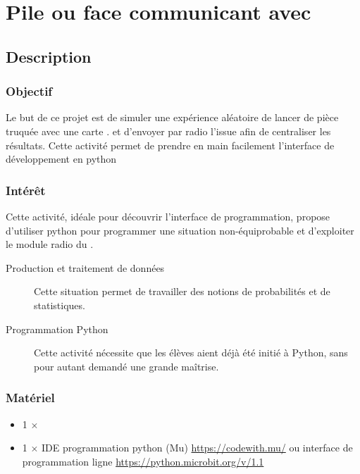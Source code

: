 
\section{Pile ou face communicant avec \mbpy}


\subsection{Description}

\subsubsection{Objectif}

\begin{formule}
Le but de ce projet est de simuler une expérience aléatoire de lancer de pièce truquée avec une carte \mb. et d'envoyer par radio l'issue afin de centraliser les résultats.
Cette activité permet de prendre en main facilement l'interface de développement en python
\end{formule}

\subsubsection{Intérêt}
Cette activité, idéale pour découvrir l'interface de programmation, propose d'utiliser python pour programmer une situation non-équiprobable et d'exploiter le module radio du \mb. 
\begin{description}
    \item [Production et traitement de données] Cette situation permet de travailler des notions de probabilités et de statistiques.
    \item [Programmation Python] Cette activité nécessite que les élèves aient déjà été initié à Python, sans pour autant demandé une grande maîtrise.
    
\end{description}


\subsubsection{Matériel}
\begin{itemize}
    \item 1 $\times$ \matosMb
    \item 1 $\times$ IDE programmation python (Mu) \url{https://codewith.mu/} ou interface de programmation ligne \url{https://python.microbit.org/v/1.1}
\end{itemize}

